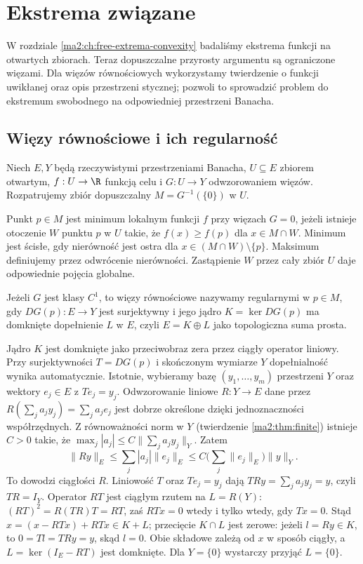 \chapter{Ekstrema związane}
\label{ma2:ch:constrained-extrema}

W rozdziale \ref{ma2:ch:free-extrema-convexity} badaliśmy
ekstrema funkcji na otwartych zbiorach. Teraz dopuszczalne
przyrosty argumentu są ograniczone więzami. Dla więzów
równościowych wykorzystamy twierdzenie o funkcji uwikłanej
oraz opis przestrzeni stycznej; pozwoli to sprowadzić
problem do ekstremum swobodnego na odpowiedniej przestrzeni
Banacha.

\section{Więzy równościowe i ich regularność}

Niech $E,Y$ będą rzeczywistymi przestrzeniami Banacha,
$U\subseteq E$ zbiorem otwartym, $f:U\to\R$ funkcją
celu i $G:U\to Y$ odwzorowaniem więzów. Rozpatrujemy
zbiór dopuszczalny $M=G^{-1}(\{0\})$ w $U$.

\begin{definicja}
\label{ma2:def:constrained-extremum}
Punkt $p\in M$ jest minimum lokalnym funkcji $f$ przy
więzach $G=0$, jeżeli istnieje otoczenie $W$ punktu $p$
w $U$ takie, że $f(x)\ge f(p)$ dla $x\in M\cap W$.
Minimum jest ścisłe, gdy nierówność jest ostra dla
$x\in(M\cap W)\setminus\{p\}$. Maksimum definiujemy
przez odwrócenie nierówności. Zastąpienie $W$ przez
cały zbiór $U$ daje odpowiednie pojęcia globalne.
\end{definicja}

\begin{definicja}
\label{ma2:def:regular-equality}
Jeżeli $G$ jest klasy $C^1$, to więzy równościowe
nazywamy regularnymi w $p\in M$, gdy $DG(p):E\to Y$
jest surjektywny i jego jądro $K=\ker DG(p)$ ma
domknięte dopełnienie $L$ w $E$, czyli
$E=K\oplus L$ jako topologiczna suma prosta.
\end{definicja}

Jądro $K$ jest domknięte jako przeciwobraz zera
przez ciągły operator liniowy. Przy surjektywności
$T=DG(p)$ i skończonym wymiarze $Y$ dopełnialność
wynika automatycznie. Istotnie, wybieramy bazę
$(y_1,\ldots,y_m)$ przestrzeni $Y$ oraz wektory
$e_j\in E$ z $Te_j=y_j$. Odwzorowanie liniowe
$R:Y\to E$ dane przez $R(\sum_j a_jy_j)=\sum_j a_je_j$
jest dobrze określone dzięki jednoznaczności współrzędnych.
Z równoważności norm w $Y$ (twierdzenie \ref{ma2:thm:finite})
istnieje $C>0$ takie, że
$\max_j|a_j|\le C\|\sum_j a_jy_j\|_Y$. Zatem
\[
 \|Ry\|_E\le \sum_j |a_j|\|e_j\|_E
 \le C\Big(\sum_j\|e_j\|_E\Big)\|y\|_Y.
\]
To dowodzi ciągłości $R$. Liniowość $T$ oraz $Te_j=y_j$
dają $TRy=\sum_j a_jy_j=y$, czyli $TR=I_Y$.
Operator $RT$ jest ciągłym rzutem na $L=R(Y)$:
$(RT)^2=R(TR)T=RT$, zaś $RTx=0$ wtedy i tylko wtedy,
gdy $Tx=0$. Stąd
$x=(x-RTx)+RTx\in K+L$; przecięcie $K\cap L$
jest zerowe: jeżeli $l=Ry\in K$, to
$0=Tl=TRy=y$, skąd $l=0$. Obie składowe zależą od $x$ w sposób
ciągły, a $L=\ker(I_E-RT)$ jest domknięte.
Dla $Y=\{0\}$ wystarczy przyjąć $L=\{0\}$.

